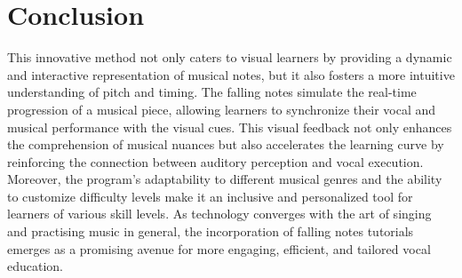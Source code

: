 \section{Conclusion}

This innovative method not only caters to visual learners by providing a dynamic and interactive representation of musical notes, but it also fosters a more intuitive understanding of pitch and timing. The falling notes simulate the real-time progression of a musical piece, allowing learners to synchronize their vocal and musical performance with the visual cues. 
This visual feedback not only enhances the comprehension of musical nuances but also accelerates the learning curve by reinforcing the connection between auditory perception and vocal execution. Moreover, the program's adaptability to different musical genres and the ability to customize difficulty levels make it an inclusive and personalized tool for learners of various skill levels. As technology converges with the art of singing and practising music in general, the incorporation of falling notes tutorials emerges as a promising avenue for more engaging, efficient, and tailored vocal education.